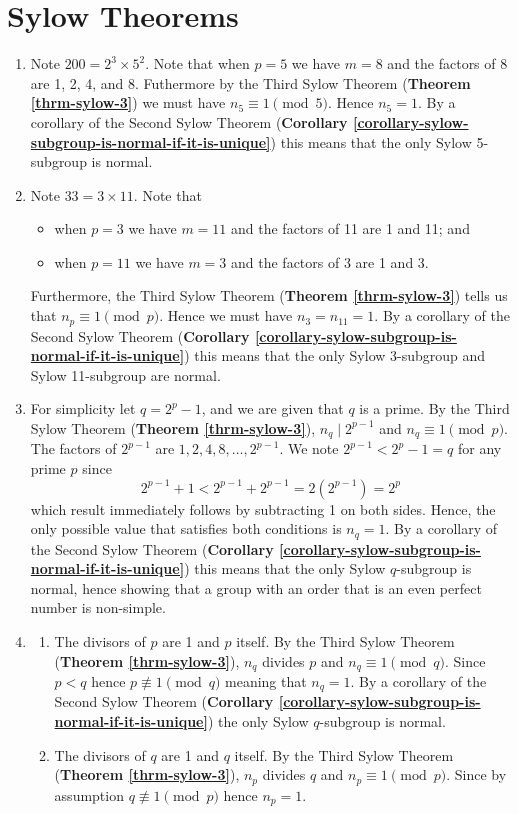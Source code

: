 \section{Sylow Theorems}
\begin{enumerate}
    \item Note $200 = 2^3 \times 5^2$. Note that when $p = 5$ we have $m = 8$ and the factors of 8 are 1, 2, 4, and 8. Futhermore by the Third Sylow Theorem (\textbf{Theorem \ref{thrm-sylow-3}}) we must have $n_5 \equiv 1 \pmod 5$. Hence $n_5 = 1$. By a corollary of the Second Sylow Theorem (\textbf{Corollary \ref{corollary-sylow-subgroup-is-normal-if-it-is-unique}}) this means that the only Sylow 5-subgroup is normal.

    \item Note $33 = 3 \times 11$. Note that
    \begin{itemize}
        \item when $p = 3$ we have $m = 11$ and the factors of 11 are 1 and 11; and
        \item when $p = 11$ we have $m = 3$ and the factors of 3 are 1 and 3.
    \end{itemize}
    Furthermore, the Third Sylow Theorem (\textbf{Theorem \ref{thrm-sylow-3}}) tells us that $n_p \equiv 1 \pmod p$. Hence we must have $n_3 = n_{11} = 1$. By a corollary of the Second Sylow Theorem (\textbf{Corollary \ref{corollary-sylow-subgroup-is-normal-if-it-is-unique}}) this means that the only Sylow 3-subgroup and Sylow 11-subgroup are normal.

    \item For simplicity let $q = 2^p - 1$, and we are given that $q$ is a prime. By the Third Sylow Theorem (\textbf{Theorem \ref{thrm-sylow-3}}), $n_q \mid 2^{p-1}$ and $n_q \equiv 1 \pmod p$. The factors of $2^{p-1}$ are $1, 2, 4, 8, \dots, 2^{p-1}$. We note $2^{p-1} < 2^p - 1 = q$ for any prime $p$ since
    \[
        2^{p-1} + 1 < 2^{p-1} + 2^{p-1} = 2(2^{p-1}) = 2^p    
    \]
    which result immediately follows by subtracting 1 on both sides. Hence, the only possible value that satisfies both conditions is $n_q = 1$. By a corollary of the Second Sylow Theorem (\textbf{Corollary \ref{corollary-sylow-subgroup-is-normal-if-it-is-unique}}) this means that the only Sylow $q$-subgroup is normal, hence showing that a group with an order that is an even perfect number is non-simple.

    \item \begin{enumerate}[label=(\roman*)]
        \item The divisors of $p$ are 1 and $p$ itself. By the Third Sylow Theorem (\textbf{Theorem \ref{thrm-sylow-3}}), $n_q$ divides $p$ and $n_q \equiv 1 \pmod q$. Since $p < q$ hence $p \not\equiv 1 \pmod q$ meaning that $n_q = 1$. By a corollary of the Second Sylow Theorem (\textbf{Corollary \ref{corollary-sylow-subgroup-is-normal-if-it-is-unique}}) the only Sylow $q$-subgroup is normal.
        \item The divisors of $q$ are 1 and $q$ itself. By the Third Sylow Theorem (\textbf{Theorem \ref{thrm-sylow-3}}), $n_p$ divides $q$ and $n_p \equiv 1 \pmod p$. Since by assumption $q \not\equiv 1 \pmod p$ hence $n_p = 1$.
        

\end{enumerate}
\end{enumerate}
